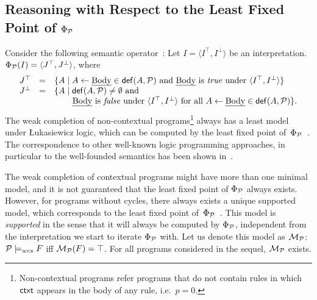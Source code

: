 \documentclass[12pt]{article}
\begin{document}
\subsection{Reasoning with Respect to the Least Fixed Point of $\Phi_{{\cal P}}$}\label{sect:lfp}


Consider the following semantic operator~\cite{stenning:vanlambalgen:2008}: Let $I = \langle I^\top,I^\bot
\rangle$ be an interpretation. $\Phi_{\cal P} (I) =
\langle J^\top,J^\bot\rangle$, where
\[
\begin{array}{lcl}
J^\top & = & \{ A \mid A \leftarrow \Body \in \Def(A,\CalP)
\mbox{ and
} \Body \mbox{ is \True under } \langle I^\top,I^\bot \rangle \} \\
J^\bot & = & \{ A \mid \Def(A,\CalP) \neq \emptyset \mbox{ and }\\
&& \rule{7.5mm}{0mm}\Body \mbox{ is \False under } \langle
I^\top,I^\bot \rangle \mbox{ for all }  A \leftarrow \Body \in \Def(A,\CalP)\}.
\end{array}\Shrink
\]
The weak completion of non-contextual programs\footnote{Non-contextual programs refer programs that do not contain rules in which $\mathsf{ctxt}$ appears in the body of any rule, i.e.\ $p = 0$.} 
always has a least model under  {\L}ukasiewicz logic,
which can be computed by the least fixed point of~$\Phi_{{\cal P}}$~\cite{hk:2009a}. The correspondence to other well-known logic programming approaches, in particular 
to the well-founded semantics has been shown in~\cite{dietz:hoelldobler:wernhard:2014}.
 
The weak completion of contextual
programs might have more than one minimal model, and it is not guaranteed that 
the least fixed point of $\Phi_{{\cal P}}$ always exists. However,
for programs without cycles, there always exists a unique supported model,
which corresponds to the least fixed point of~$\Phi_{{\cal P}}$~\cite{dietz:hoelldobler:pereira:2017,dietz:hoelldobler:philipp:2017}. This model is \textit{supported} in the sense that 
it will always be computed by $\Phi_{{\cal P}}$, independent from the interpretation we start to iterate $\Phi_{{\cal P}}$ with. Let us denote this model as ${\cal M}_{\cal P}$:
${\cal P} \models_{wcs} F$ iff ${\cal M}_{\cal P}(F) = \top$.
For all programs considered in the sequel, ${\cal M}_{\cal P}$ exists.
\end{document}
